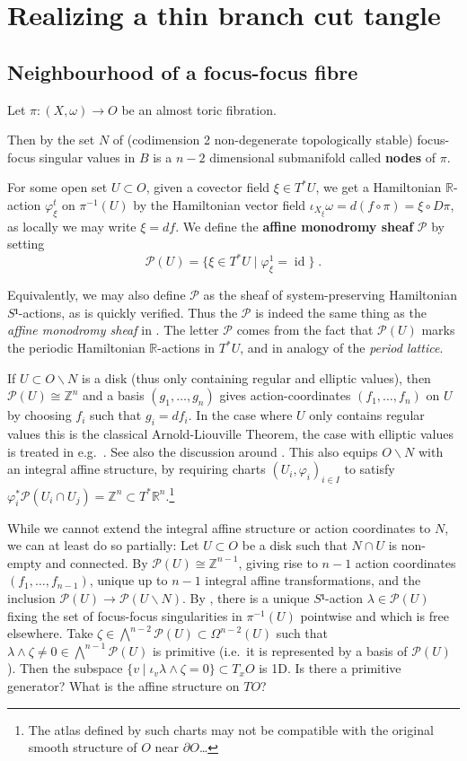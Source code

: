 \documentclass[12pt,a4paper,abstract=true,draft]{scrartcl}
\DeclareMathOperator{\id}{id}
\begin{document}
\section{Realizing a thin branch cut tangle}

\subsection{Neighbourhood of a focus-focus fibre}

Let $π \colon (X,ω) → O$ be an almost toric fibration.

Then by \cite[Proposition~5.4]{Zun96} the set $N$ of (codimension 2 non-degenerate topologically stable) focus-focus singular values in $B$ is a $n-2$ dimensional submanifold called \textbf{nodes} of $π$.

For some open set $U ⊂ O$, given a covector field $ξ ∈ T^*U$, we get a Hamiltonian $ℝ$-action $φ_ξ^t$ on $π^{-1}(U)$ by the Hamiltonian vector field $ι_{X_ξ} ω = d(f ∘ π) = ξ ∘ Dπ$, as locally we may write $ξ=df$.
We define the \textbf{affine monodromy sheaf} $𝒫$ by setting
\[𝒫(U) = \{ξ ∈ T^*U \mid φ_ξ^1 = \id \} \; .\]

\begin{remark}
  Equivalently, we may also define $𝒫$ as the sheaf of system-preserving Hamiltonian $S¹$-actions, as is quickly verified.
  Thus the $𝒫$ is indeed the same thing as the \emph{affine monodromy sheaf} in \cite{Zun03}.
  The letter $𝒫$ comes from the fact that $𝒫(U)$ marks the periodic Hamiltonian $ℝ$-actions in $T^*U$, and in analogy of the \emph{period lattice}.
\end{remark}

If $U ⊂ O ∖ N$ is a disk (thus only containing regular and elliptic values), then $𝒫(U) ≅ ℤ^n$ and a basis $(g_1,…,g_n)$ gives action-coordinates $(f_1,…,f_n)$ on $U$ by choosing $f_i$ such that $g_i = df_i$.
In the case where $U$ only contains regular values this is the classical Arnold-Liouville Theorem, the case with elliptic values is treated in e.g.\ \cite{DuMo91}.
See also the discussion around \cite[Theorem 3.9]{Zun96}.
This also equips $O ∖ N$ with an integral affine structure, by requiring charts $(U_i,φ_i)_{i ∈ I}$ to satisfy $φ_i^* 𝒫(U_i ∩ U_j) = ℤ^n ⊂ T^*ℝ^n$.\footnote{The atlas defined by such charts may not be compatible with the original smooth structure of $O$ near $∂O$…}

While we cannot extend the integral affine structure or action coordinates to $N$, we can at least do so partially:
Let $U ⊂ O$ be a disk such that $N ∩ U$ is non-empty and connected.
By \cite[Proposition 5.2 a)]{Zun96} $𝒫(U) ≅ ℤ^{n-1}$, giving rise to $n-1$ action coordinates $(f_1,…,f_{n-1})$, unique up to $n-1$ integral affine transformations, and the inclusion $𝒫(U) → 𝒫(U ∖ N)$.
By \cite[Proposition 5.2 b) and Proposition 5.4 a)]{Zun96}, there is a unique $S¹$-action $λ ∈ 𝒫(U)$ fixing the set of focus-focus singularities in $π^{-1}(U)$ pointwise and which is free elsewhere.
Take $ζ ∈ ⋀^{n-2}𝒫(U) ⊂ Ω^{n-2}(U)$ such that $λ ∧ ζ ≠ 0 ∈ ⋀^{n-1}𝒫(U)$ is primitive (i.e.\ it is represented by a basis of $𝒫(U)$).
Then the subspace $\{v \mid ι_v λ ∧ ζ = 0\} ⊂ T_x O$ is 1D. Is there a primitive generator? What is the affine structure on $TO$?
\end{document}
